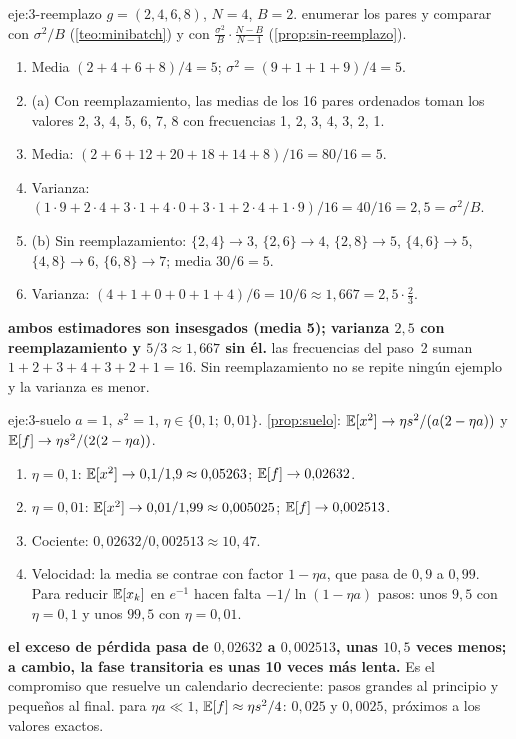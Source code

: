 \begin{solucion}{eje:3-reemplazo}
\datos $g=(2,4,6,8)$, $N=4$, $B=2$.
\planteamiento enumerar los pares y comparar con $\sigma^{2}/B$ (\cref{teo:minibatch}) y con $\frac{\sigma^{2}}{B}\cdot\frac{N-B}{N-1}$ (\cref{prop:sin-reemplazo}).
\pasos
\begin{enumerate}[label=\arabic*.]
  \item Media $(2+4+6+8)/4=5$; $\sigma^{2}=(9+1+1+9)/4=5$.
  \item (a) Con reemplazamiento, las medias de los 16 pares ordenados toman los valores 2, 3, 4, 5, 6, 7, 8 con frecuencias 1, 2, 3, 4, 3, 2, 1.
  \item Media: $(2+6+12+20+18+14+8)/16=80/16=5$.
  \item Varianza: $(1\cdot 9+2\cdot 4+3\cdot 1+4\cdot 0+3\cdot 1+2\cdot 4+1\cdot 9)/16=40/16=2{,}5=\sigma^{2}/B$.
  \item (b) Sin reemplazamiento: $\{2,4\}\to 3$, $\{2,6\}\to 4$, $\{2,8\}\to 5$, $\{4,6\}\to 5$, $\{4,8\}\to 6$, $\{6,8\}\to 7$; media $30/6=5$.
  \item Varianza: $(4+1+0+0+1+4)/6=10/6\approx 1{,}667=2{,}5\cdot\frac23$.
\end{enumerate}
\resultado \textbf{ambos estimadores son insesgados (media 5); varianza $2{,}5$ con reemplazamiento y $5/3\approx 1{,}667$ sin él.}
\comprobacion las frecuencias del paso~2 suman $1+2+3+4+3+2+1=16$. Sin reemplazamiento no se repite ningún ejemplo y la varianza es menor.
\end{solucion}

\begin{solucion}{eje:3-suelo}
\datos $a=1$, $s^{2}=1$, $\eta\in\{0{,}1;\ 0{,}01\}$.
\planteamiento \cref{prop:suelo}: $\mathbb{E}[x^{2}]\to\eta s^{2}/(a(2-\eta a))$ y $\mathbb{E}[f]\to\eta s^{2}/(2(2-\eta a))$.
\pasos
\begin{enumerate}[label=\arabic*.]
  \item $\eta=0{,}1$: $\mathbb{E}[x^{2}]\to 0{,}1/1{,}9\approx 0{,}05263$; $\mathbb{E}[f]\to 0{,}02632$.
  \item $\eta=0{,}01$: $\mathbb{E}[x^{2}]\to 0{,}01/1{,}99\approx 0{,}005025$; $\mathbb{E}[f]\to 0{,}002513$.
  \item Cociente: $0{,}02632/0{,}002513\approx 10{,}47$.
  \item Velocidad: la media se contrae con factor $1-\eta a$, que pasa de $0{,}9$ a $0{,}99$. Para reducir $\mathbb{E}[x_k]$ en $e^{-1}$ hacen falta $-1/\ln(1-\eta a)$ pasos: unos $9{,}5$ con $\eta=0{,}1$ y unos $99{,}5$ con $\eta=0{,}01$.
\end{enumerate}
\resultado \textbf{el exceso de pérdida pasa de $0{,}02632$ a $0{,}002513$, unas $10{,}5$ veces menos; a cambio, la fase transitoria es unas 10 veces más lenta.} Es el compromiso que resuelve un calendario decreciente: pasos grandes al principio y pequeños al final.
\comprobacion para $\eta a\ll 1$, $\mathbb{E}[f]\approx\eta s^{2}/4$: $0{,}025$ y $0{,}0025$, próximos a los valores exactos.
\end{solucion}

